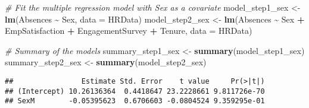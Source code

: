 \documentclass[
]{article}
\newenvironment{Shaded}{\begin{snugshade}}{\end{snugshade}}
\newcommand{\AttributeTok}[1]{\textcolor[rgb]{0.13,0.29,0.53}{#1}}
\newcommand{\CommentTok}[1]{\textcolor[rgb]{0.56,0.35,0.01}{\textit{#1}}}
\newcommand{\FunctionTok}[1]{\textcolor[rgb]{0.13,0.29,0.53}{\textbf{#1}}}
\newcommand{\NormalTok}[1]{#1}
\newcommand{\OtherTok}[1]{\textcolor[rgb]{0.56,0.35,0.01}{#1}}
\newcommand{\SpecialCharTok}[1]{\textcolor[rgb]{0.81,0.36,0.00}{\textbf{#1}}}
\newcommand{\StringTok}[1]{\textcolor[rgb]{0.31,0.60,0.02}{#1}}
\begin{document}
\begin{Shaded}
\begin{Highlighting}[]
\CommentTok{\# Fit the multiple regression model with Sex as a covariate}
\NormalTok{model\_step1\_sex }\OtherTok{\textless{}{-}} \FunctionTok{lm}\NormalTok{(Absences }\SpecialCharTok{\textasciitilde{}}\NormalTok{ Sex, }\AttributeTok{data =}\NormalTok{ HRData)}
\NormalTok{model\_step2\_sex }\OtherTok{\textless{}{-}} \FunctionTok{lm}\NormalTok{(Absences }\SpecialCharTok{\textasciitilde{}}\NormalTok{ Sex }\SpecialCharTok{+}\NormalTok{ EmpSatisfaction }\SpecialCharTok{+}\NormalTok{ EngagementSurvey }\SpecialCharTok{+}\NormalTok{ Tenure, }\AttributeTok{data =}\NormalTok{ HRData)}

\CommentTok{\# Summary of the models}
\NormalTok{summary\_step1\_sex }\OtherTok{\textless{}{-}} \FunctionTok{summary}\NormalTok{(model\_step1\_sex)}
\NormalTok{summary\_step2\_sex }\OtherTok{\textless{}{-}} \FunctionTok{summary}\NormalTok{(model\_step2\_sex)}
\end{Highlighting}
\end{Shaded}

\begin{Shaded}
\end{Shaded}

\begin{verbatim}
##                Estimate Std. Error    t value     Pr(>|t|)
## (Intercept) 10.26136364  0.4418647 23.2228661 9.811726e-70
## SexM        -0.05395623  0.6706603 -0.0804524 9.359295e-01
\end{verbatim}
\end{document}
